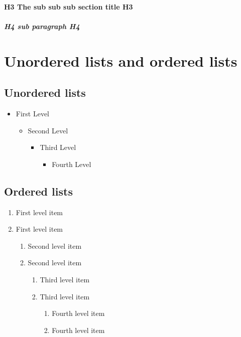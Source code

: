 \documentclass[Theme1]{{template_material/eurostat}}
\begin{document}
\paragraph{H3 The sub sub sub section title H3}
\lipsum[1-1]
\subparagraph{H4 sub paragraph H4}
\lipsum[1-1]

\newpage %
\section{Unordered lists and ordered lists}

\subsection{Unordered lists}
 \begin{itemize}
   \item  First Level
   \begin{itemize}
     \item  Second Level
     \begin{itemize}
       \item  Third Level
       \begin{itemize}
         \item  Fourth Level
       \end{itemize}
     \end{itemize}
   \end{itemize}
 \end{itemize}

\subsection{Ordered lists}
\begin{enumerate}
   \item First level item
   \item First level item
   \begin{enumerate}
     \item Second level item
     \item Second level item
     \begin{enumerate}
       \item Third level item
       \item Third level item
       \begin{enumerate}
         \item Fourth level item
         \item Fourth level item
       \end{enumerate}
     \end{enumerate}
   \end{enumerate}
 \end{enumerate}
\newpage %
\end{document}
